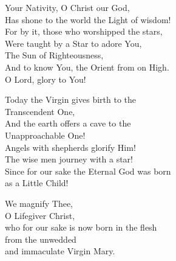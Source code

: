 \documentclass{article}
\begin{document}
%
%
Your Nativity, O Christ our God,\\
Has shone to the world the Light of wisdom!\\
For by it, those who worshipped the stars,\\
Were taught by a Star to adore You,\\
The Sun of Righteousness,\\
And to know You, the Orient from on High.\\
O Lord, glory to You!

%
Today the Virgin gives birth to the \\
   \cont Transcendent One,\\
And the earth offers a cave to the \\
    \cont Unapproachable One!\\
Angels with shepherds glorify Him!\\
The wise men journey with a star!\\
Since for our sake the Eternal God was born\\
as a Little Child!

%
We magnify Thee, \\
O Lifegiver Christ, \\
who for our sake is now born in the flesh\\
from the unwedded\\
and immaculate Virgin Mary.
\end{document}
